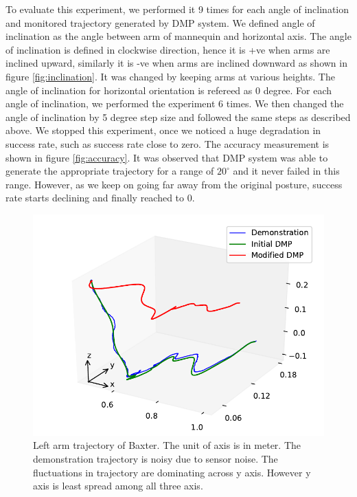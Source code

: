 \documentclass[sigconf]{acmart}
\begin{document}
To evaluate this experiment, we performed it 9 times for each angle of inclination and monitored trajectory generated by DMP system. We defined angle of inclination as the angle between arm of mannequin and horizontal axis. The angle of inclination is defined in clockwise direction, hence it is +ve when arms are inclined upward, similarly it is -ve when arms are inclined downward as shown in figure \ref{fig:inclination}. It was changed by keeping arms at various heights. The angle of inclination for horizontal  orientation is refereed as 0 degree. For each angle of inclination, we performed the experiment 6 times. We then changed the angle of inclination by 5 degree step size and followed the same steps as described above. We stopped this experiment, once we noticed a huge degradation in success rate, such as success rate close to zero. The accuracy measurement is shown in figure \ref{fig:accuracy}. It was observed that DMP system was able to generate the appropriate trajectory for a range of $20^\circ$ and it never failed in this range. However, as we keep on going far away from the original posture, success rate starts declining and finally reached to $0$.

\begin{figure}
	\includegraphics[width=\linewidth]{all_traj}
	\caption{Left arm trajectory of Baxter. The unit of axis is in meter. The demonstration trajectory is noisy due to sensor noise. The fluctuations in trajectory are dominating across y axis. However y axis is least spread among all three axis.}
	\label{fig:trajectory}
\end{figure}
\end{document}
